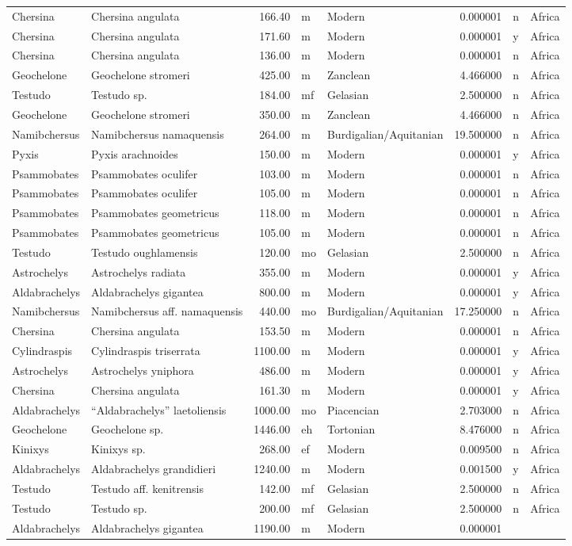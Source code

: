 \begin{landscape}
\begin{longtable}[]{@{}llrllrll@{}}
	Chersina & Chersina angulata & 166.40 & m & Modern & 0.000001 & n &
	Africa\tabularnewline
	Chersina & Chersina angulata & 171.60 & m & Modern & 0.000001 & y &
	Africa\tabularnewline
	Chersina & Chersina angulata & 136.00 & m & Modern & 0.000001 & n &
	Africa\tabularnewline
	Geochelone & Geochelone stromeri & 425.00 & m & Zanclean & 4.466000 & n
	& Africa\tabularnewline
	Testudo & Testudo sp. & 184.00 & mf & Gelasian & 2.500000 & n &
	Africa\tabularnewline
	Geochelone & Geochelone stromeri & 350.00 & m & Zanclean & 4.466000 & n
	& Africa\tabularnewline
	Namibchersus & Namibchersus namaquensis & 264.00 & m &
	Burdigalian/Aquitanian & 19.500000 & n & Africa\tabularnewline
	Pyxis & Pyxis arachnoides & 150.00 & m & Modern & 0.000001 & y &
	Africa\tabularnewline
	Psammobates & Psammobates oculifer & 103.00 & m & Modern & 0.000001 & n
	& Africa\tabularnewline
	Psammobates & Psammobates oculifer & 105.00 & m & Modern & 0.000001 & n
	& Africa\tabularnewline
	Psammobates & Psammobates geometricus & 118.00 & m & Modern & 0.000001 &
	n & Africa\tabularnewline
	Psammobates & Psammobates geometricus & 105.00 & m & Modern & 0.000001 &
	n & Africa\tabularnewline
	Testudo & Testudo oughlamensis & 120.00 & mo & Gelasian & 2.500000 & n &
	Africa\tabularnewline
	Astrochelys & Astrochelys radiata & 355.00 & m & Modern & 0.000001 & y &
	Africa\tabularnewline
	Aldabrachelys & Aldabrachelys gigantea & 800.00 & m & Modern & 0.000001
	& y & Africa\tabularnewline
	Namibchersus & Namibchersus aff. namaquensis & 440.00 & mo &
	Burdigalian/Aquitanian & 17.250000 & n & Africa\tabularnewline
	Chersina & Chersina angulata & 153.50 & m & Modern & 0.000001 & n &
	Africa\tabularnewline
	Cylindraspis & Cylindraspis triserrata & 1100.00 & m & Modern & 0.000001
	& y & Africa\tabularnewline
	Astrochelys & Astrochelys yniphora & 486.00 & m & Modern & 0.000001 & y
	& Africa\tabularnewline
	Chersina & Chersina angulata & 161.30 & m & Modern & 0.000001 & y &
	Africa\tabularnewline
	Aldabrachelys & ``Aldabrachelys'' laetoliensis & 1000.00 & mo &
	Piacencian & 2.703000 & n & Africa\tabularnewline
	Geochelone & Geochelone sp. & 1446.00 & eh & Tortonian & 8.476000 & n &
	Africa\tabularnewline
	Kinixys & Kinixys sp. & 268.00 & ef & Modern & 0.009500 & n &
	Africa\tabularnewline
	Aldabrachelys & Aldabrachelys grandidieri & 1240.00 & m & Modern &
	0.001500 & y & Africa\tabularnewline
	Testudo & Testudo aff. kenitrensis & 142.00 & mf & Gelasian & 2.500000 &
	n & Africa\tabularnewline
	Testudo & Testudo sp. & 200.00 & mf & Gelasian & 2.500000 & n &
	Africa\tabularnewline
	Aldabrachelys & Aldabrachelys gigantea & 1190.00 & m & Modern & 0.000001

\end{longtable}
\end{landscape}
